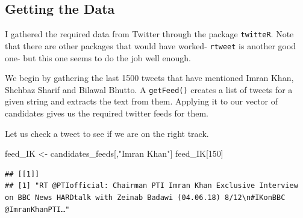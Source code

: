 \documentclass[]{article}
\newenvironment{Shaded}{\begin{snugshade}}{\end{snugshade}}
\newcommand{\KeywordTok}[1]{\textcolor[rgb]{0.13,0.29,0.53}{\textbf{#1}}}
\newcommand{\DataTypeTok}[1]{\textcolor[rgb]{0.13,0.29,0.53}{#1}}
\newcommand{\DecValTok}[1]{\textcolor[rgb]{0.00,0.00,0.81}{#1}}
\newcommand{\StringTok}[1]{\textcolor[rgb]{0.31,0.60,0.02}{#1}}
\newcommand{\ControlFlowTok}[1]{\textcolor[rgb]{0.13,0.29,0.53}{\textbf{#1}}}
\newcommand{\OperatorTok}[1]{\textcolor[rgb]{0.81,0.36,0.00}{\textbf{#1}}}
\newcommand{\NormalTok}[1]{#1}
\begin{document}
\subsection{Getting the Data}\label{getting-the-data}

I gathered the required data from Twitter through the package
\texttt{twitteR}. Note that there are other packages that would have
worked- \texttt{rtweet} is another good one- but this one seems to do
the job well enough.

We begin by gathering the last 1500 tweets that have mentioned Imran
Khan, Shehbaz Sharif and Bilawal Bhutto. A \texttt{getFeed()} creates a
list of tweets for a given string and extracts the text from them.
Applying it to our vector of candidates gives us the required twitter
feeds for them.

\begin{Shaded}
\end{Shaded}

Let us check a tweet to see if we are on the right track.

\begin{Shaded}
\begin{Highlighting}[]
\NormalTok{feed_IK <-}\StringTok{ }\NormalTok{candidates_feeds[,}\StringTok{"Imran Khan"}\NormalTok{]}
\NormalTok{feed_IK[}\DecValTok{150}\NormalTok{]}
\end{Highlighting}
\end{Shaded}

\begin{verbatim}
## [[1]]
## [1] "RT @PTIofficial: Chairman PTI Imran Khan Exclusive Interview on BBC News HARDtalk with Zeinab Badawi (04.06.18) 8/12\n#IKonBBC @ImranKhanPTI…"
\end{verbatim}
\end{document}
